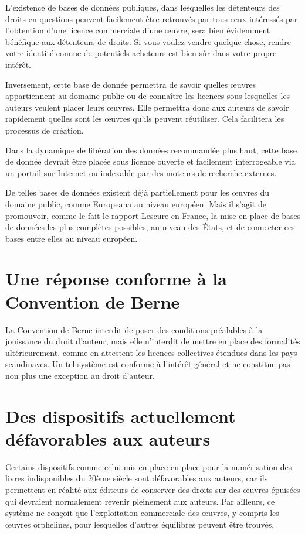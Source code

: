L’existence de bases de données publiques, dans lesquelles les détenteurs des
droits en questions peuvent facilement être retrouvés par tous ceux intéressés par l’obtention d’une
licence commerciale d’une œuvre, sera bien évidemment bénéfique aux détenteurs de droits. Si vous
voulez vendre quelque chose, rendre votre identité connue de potentiels acheteurs est bien sûr dans
votre propre intérêt.

Inversement, cette base de donnée permettra de savoir quelles œuvres appartiennent au domaine public ou de connaître les licences sous lesquelles les auteurs veulent placer leurs œuvres. Elle permettra donc aux auteurs de savoir rapidement quelles sont les œuvres qu'ils peuvent réutiliser. Cela facilitera les processus de création.

Dans la dynamique de libération des données recommandée plus haut, cette base de donnée devrait être placée sous licence ouverte et facilement interrogeable via un portail sur Internet ou indexable par des moteurs de recherche externes.

De telles bases de données existent déjà partiellement pour les œuvres du domaine public, comme Europeana au niveau européen. Mais il s'agit de promouvoir, comme le fait le rapport Lescure en France, la mise en place de bases de données les plus complètes possibles, au niveau des États, et de connecter ces bases entre elles au niveau européen.  

\section{Une réponse conforme à la Convention de Berne}
La Convention de Berne interdit de poser des conditions préalables à la jouissance du droit d’auteur, mais elle n’interdit de mettre en place des formalités ultérieurement, comme en attestent les licences collectives étendues dans les pays scandinaves. Un tel système est conforme à l'intérêt général et ne constitue pas non plus une exception au droit d'auteur.

\section{Des dispositifs actuellement défavorables aux auteurs}

Certains dispositifs comme celui mis en place en place pour la numérisation des livres indisponibles du 20ème siècle sont défavorables aux auteurs, car ils permettent en réalité aux éditeurs de conserver des droits sur des œuvres épuisées qui devraient normalement revenir pleinement aux auteurs. Par ailleurs, ce système ne conçoit que l'exploitation commerciale des œuvres, y compris les œuvres orphelines, pour lesquelles d'autres équilibres peuvent être trouvés.

